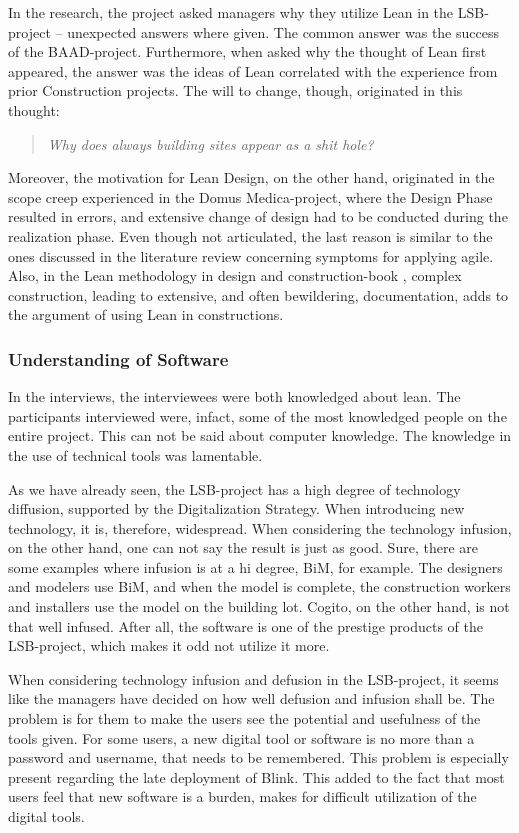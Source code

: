 In the research, the project asked managers why they utilize Lean in the LSB-project – unexpected answers where given. The common answer was the success of the BAAD-project. Furthermore, when asked why the thought of Lean first appeared, the answer was the ideas of Lean correlated with the experience from prior Construction projects. The will to change, though, originated in this thought: 
\begin{quote}
 \textit{Why does always building sites appear as a shit hole?}
\end{quote}

Moreover, the motivation for Lean Design, on the other hand, originated in the scope creep experienced in the Domus Medica-project, where the Design Phase resulted in errors, and extensive change of design had to be conducted during the realization phase. Even though not articulated, the last reason is similar to the ones discussed in the literature review concerning symptoms for applying agile. Also, in the Lean methodology in design and construction-book \cite{lean_i_praksis}, complex construction, leading to extensive, and often bewildering, documentation, adds to the argument of using Lean in constructions. 


\subsubsection{Understanding of Software}
In the interviews, the interviewees were both knowledged about lean. The participants interviewed were, infact, some of the most knowledged people on the entire project. This can not be said about computer knowledge. The knowledge in the use of technical tools was lamentable.

As we have already seen, the LSB-project has a high degree of technology diffusion, supported by the Digitalization Strategy. When introducing new technology, it is, therefore, widespread. When considering the technology infusion, on the other hand, one can not say the result is just as good. Sure, there are some examples where infusion is at a hi degree, BiM, for example. The designers and modelers use BiM, and when the model is complete, the construction workers and installers use the model on the building lot. Cogito, on the other hand, is not that well infused. After all, the software is one of the prestige products of the LSB-project, which makes it odd not utilize it more. 

When considering technology infusion and defusion in the LSB-project, it seems like the managers have decided on how well defusion and infusion shall be. The problem is for them to make the users see the potential and usefulness of the tools given. For some users, a new digital tool or software is no more than a password and username, that needs to be remembered. This problem is especially present regarding the late deployment of Blink. This added to the fact that most users feel that new software is a burden, makes for difficult utilization of the digital tools. 

